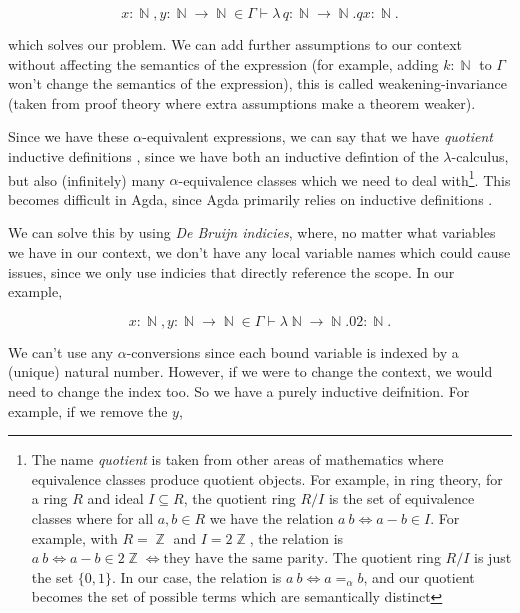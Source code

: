 \documentclass[logo,bsc,singlespacing,parskip,online]{infthesis}
\DeclareMathOperator{\nat}{\mathbb{N}}
\DeclareMathOperator{\integer}{\mathbb{Z}}
\begin{document}
\begin{equation*}
  x \colon \nat, y \colon \nat \to \nat \in \Gamma \vdash \lambda \, q \colon \nat \to \nat. q x \colon \nat.
\end{equation*}

which solves our problem. We can add further assumptions to our context without
affecting the semantics of the expression (for example, adding $k \colon \nat$
to $\Gamma$ won't change the semantics of the expression), this is called
weakening-invariance (taken from proof theory where extra assumptions make a
theorem weaker).

Since we have these $\alpha$-equivalent expressions, we can say that we have
\textit{quotient} inductive definitions \citep{aydemir_engineering_2008}, since
we have both an inductive defintion of the $\lambda$-calculus, but also
(infinitely) many $\alpha$-equivalence classes which we need to deal
with\footnote{The name \textit{quotient} is taken from other areas of
mathematics where equivalence classes produce quotient objects. For example, in
ring theory, for a ring $R$ and ideal $I \subseteq R$, the quotient ring $R/I$
is the set of equivalence classes where for all $a, b \in R$ we have the
relation $a ~ b \iff a - b \in I$. For example, with $R = \integer$ and $I =
2\integer$, the relation is $a ~ b \iff a - b \in 2\integer \iff \text{they have
the same parity}$. The quotient ring $R/I$ is just the set $\{0, 1\}$. In our
case, the relation is $a ~ b \iff a =_{\alpha} b$, and our quotient becomes the
set of possible terms which are semantically distinct}. This becomes difficult
in Agda, since Agda primarily relies on inductive definitions
\citep{pitts_locally_2023}.

We can solve this by using \textit{De Bruijn indicies}, where, no matter what
variables we have in our context, we don't have any local variable names which
could cause issues, since we only use indicies that directly reference the
scope. In our example,

\begin{equation*}
  x \colon \nat, y \colon \nat \to \nat \in \Gamma \vdash \lambda \nat \to \nat. 0 2 \colon \nat.
\end{equation*}

We can't use any $\alpha$-conversions since each bound variable is indexed by a
(unique) natural number. However, if we were to change the context, we would
need to change the index too. So we have a purely inductive deifnition. For
example, if we remove the $y$,
\end{document}
